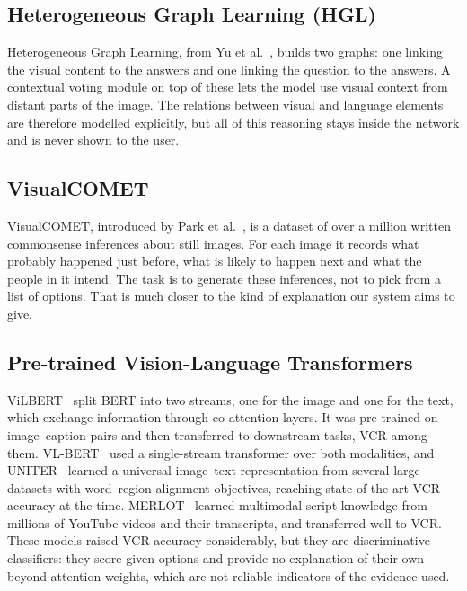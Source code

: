 \subsection{Heterogeneous Graph Learning (HGL)}
Heterogeneous Graph Learning, from Yu et al.~\cite{yu2019hgl}, builds two graphs: one linking the visual content to the answers and one linking the question to the answers. A contextual voting module on top of these lets the model use visual context from distant parts of the image. The relations between visual and language elements are therefore modelled explicitly, but all of this reasoning stays inside the network and is never shown to the user.

\subsection{VisualCOMET}
VisualCOMET, introduced by Park et al.~\cite{park2020visualcomet}, is a dataset of over a million written commonsense inferences about still images. For each image it records what probably happened just before, what is likely to happen next and what the people in it intend. The task is to generate these inferences, not to pick from a list of options. That is much closer to the kind of explanation our system aims to give.

\subsection{Pre-trained Vision-Language Transformers}
ViLBERT~\cite{lu2019vilbert} split BERT into two streams, one for the image and one for the text, which exchange information through co-attention layers. It was pre-trained on image--caption pairs and then transferred to downstream tasks, VCR among them. VL-BERT~\cite{su2020vlbert} used a single-stream transformer over both modalities, and UNITER~\cite{chen2020uniter} learned a universal image--text representation from several large datasets with word--region alignment objectives, reaching state-of-the-art VCR accuracy at the time. MERLOT~\cite{zellers2021merlot} learned multimodal script knowledge from millions of YouTube videos and their transcripts, and transferred well to VCR. These models raised VCR accuracy considerably, but they are discriminative classifiers: they score given options and provide no explanation of their own beyond attention weights, which are not reliable indicators of the evidence used.

